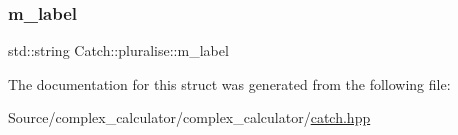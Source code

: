 \mbox{\label{struct_catch_1_1pluralise_a8849cbdd3f11ebe7747597c8644e8793}} 
\subsubsection{\texorpdfstring{m\+\_\+label}{m\_label}}
{\footnotesize\ttfamily std\+::string Catch\+::pluralise\+::m\+\_\+label}



The documentation for this struct was generated from the following file\+:\begin{DoxyCompactItemize}
\item 
Source/complex\+\_\+calculator/complex\+\_\+calculator/\mbox{\hyperlink{catch_8hpp}{catch.\+hpp}}\end{DoxyCompactItemize}
